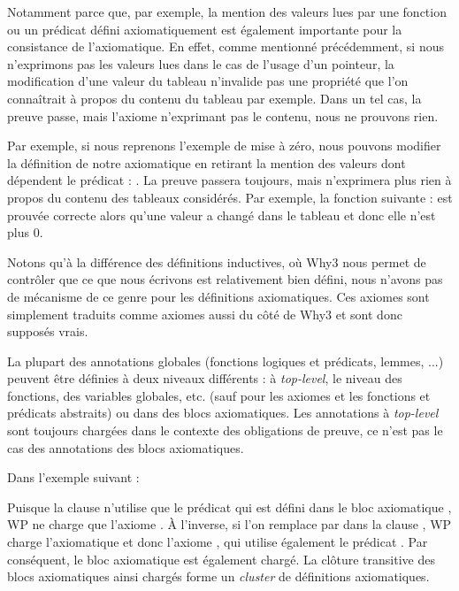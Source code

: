 Notamment parce que, par exemple, la mention des valeurs lues par une fonction
ou un prédicat défini axiomatiquement est également importante pour la
consistance de l'axiomatique. En effet, comme mentionné précédemment, si nous
n'exprimons pas les valeurs lues dans le cas de l'usage d'un pointeur, la
modification d'une valeur du tableau n'invalide pas une propriété que l'on
connaîtrait à propos du contenu du tableau par exemple. Dans un tel cas, la
preuve passe, mais l'axiome n'exprimant pas le contenu, nous ne prouvons rien.



Par exemple, si nous reprenons l'exemple de mise à zéro, nous pouvons modifier
la définition de notre axiomatique en retirant la mention des valeurs dont
dépendent le prédicat : . La preuve passera toujours,
mais n'exprimera plus rien à propos du contenu des tableaux considérés.
Par exemple, la fonction suivante :
est prouvée correcte alors qu'une valeur a changé dans le tableau et donc elle
n'est plus 0.


Notons qu'à la différence des définitions inductives, où Why3 nous permet de contrôler
que ce que nous écrivons est relativement bien défini, nous n'avons pas de mécanisme
de ce genre pour les définitions axiomatiques. Ces axiomes sont simplement traduits
comme axiomes aussi du côté de Why3 et sont donc supposés vrais.




La plupart des annotations globales (fonctions logiques et prédicats, lemmes, ...)
peuvent être définies à deux niveaux différents : à \textit{top-level}, le niveau
des fonctions, des variables globales, etc. (sauf pour les axiomes et les
fonctions et prédicats abstraits) ou dans des blocs axiomatiques. Les
annotations à \textit{top-level} sont toujours chargées dans le contexte des
obligations de preuve, ce n'est pas le cas des annotations des blocs
axiomatiques.


Dans l'exemple suivant :




Puisque la clause  n'utilise que le prédicat 
qui est défini dans le bloc axiomatique , WP ne charge que
l'axiome . À l'inverse, si l'on remplace  par
 dans la clause , WP charge l'axiomatique
 et donc l'axiome , qui utilise également le
prédicat . Par conséquent, le bloc axiomatique  est
également chargé. La clôture transitive des blocs axiomatiques ainsi chargés
forme un \textit{cluster} de définitions axiomatiques.


